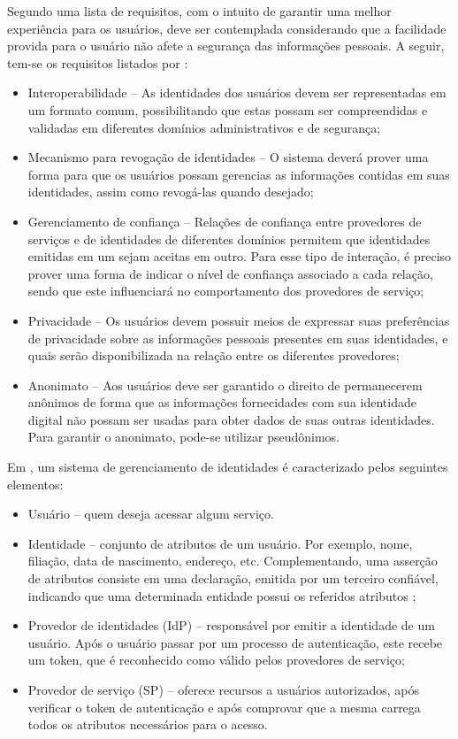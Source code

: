 Segundo  uma lista de requisitos, com o intuito de garantir uma melhor experiência para os usuários, deve ser contemplada considerando que a facilidade provida para o usuário não afete a segurança das informações pessoais. A seguir, tem-se os requisitos listados por \cite{damiani:03}:
\begin{itemize}
 \item Interoperabilidade -- As identidades dos usuários devem ser representadas em um formato comum, possibilitando que estas possam ser compreendidas e validadas em diferentes domínios administrativos e de segurança;
 \item Mecanismo para revogação de identidades -- O sistema deverá prover uma forma para que os usuários possam gerencias as informações contidas em suas identidades, assim como revogá-las quando desejado;
 \item Gerenciamento de confiança -- Relações de confiança entre provedores de serviços e de identidades de diferentes domínios permitem que identidades emitidas em um sejam aceitas em outro. Para esse tipo de interação, é preciso prover uma forma de indicar o nível de confiança associado a cada relação, sendo que este influenciará no comportamento dos provedores de serviço;
 \item Privacidade -- Os usuários devem possuir meios de expressar suas preferências de privacidade sobre as informações pessoais presentes em suas identidades, e quais serão disponibilizada na relação entre os diferentes provedores;
 \item Anonimato -- Aos usuários deve ser garantido o direito de permanecerem anônimos de forma que as informações fornecidades com sua identidade digital não possam ser usadas para obter dados de suas outras identidades. Para garantir o anonimato, pode-se utilizar pseudônimos.
\end{itemize}

Em , um sistema de gerenciamento de identidades é caracterizado pelos seguintes elementos:

\begin{itemize}
 \item Usuário -- quem deseja acessar algum serviço.
 \item Identidade -- conjunto de atributos de um usuário. Por exemplo, nome, filiação, data de nascimento, endereço, etc. Complementando, uma asserção de atributos consiste em uma declaração, emitida por um terceiro confiável, indicando que uma determinada entidade possui os referidos atributos \cite{wangham:10b};
 \item Provedor de identidades (IdP) -- responsável por emitir a identidade de um usuário. Após o usuário passar por um processo de autenticação, este recebe um token, que é reconhecido como válido pelos provedores de serviço;
 \item Provedor de serviço (SP) -- oferece recursos a usuários autorizados, após verificar o token de autenticação e após comprovar que a mesma carrega todos os atributos necessários para o acesso.
\end{itemize}


